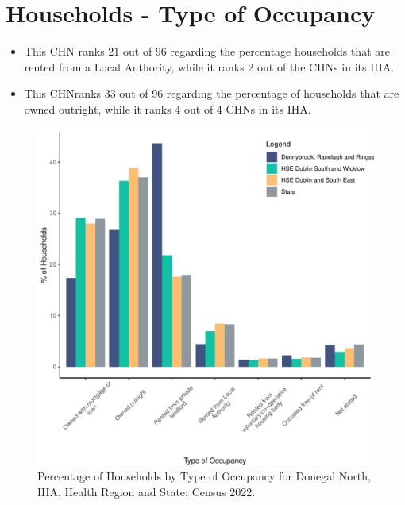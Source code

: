 \documentclass{article}
\begin{document}
\section{Households - Type of Occupancy}\label{sect:Households}
\begin{itemize}
\item This CHN ranks  21 out of 96 regarding the percentage households that are rented from a Local Authority, while it ranks  2 out of the CHNs in its IHA. 
\item This CHNranks  33 out of 96 regarding the percentage of households that are owned outright, while it ranks   4 out of 4 CHNs in its IHA.
\end{itemize}
\begin{figure}[H]
	\centering
	\includegraphics[width = 140mm]{../figures/HouseholdsED.pdf}
	\caption{Percentage of Households by Type of Occupancy for Donegal North, IHA, Health Region and State; Census 2022.}
	\label{fig:vbnv}
	\end{figure}
\end{document}
